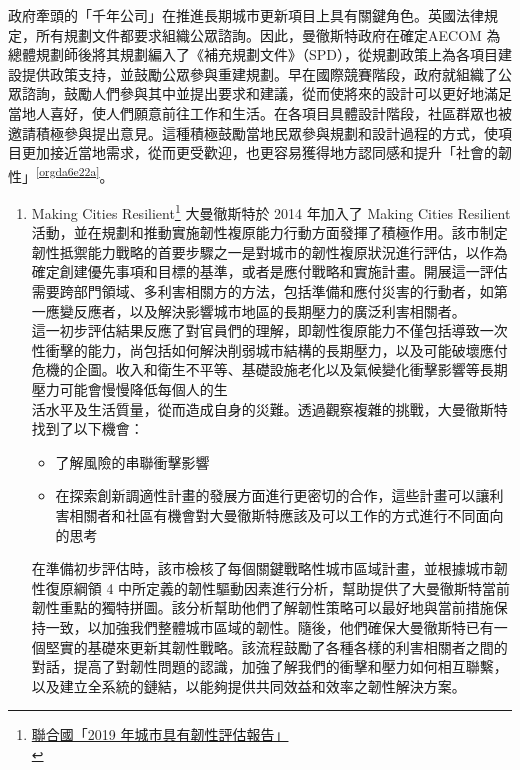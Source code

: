 \documentclass[a4paper,12pt]{article}
\begin{document}
政府牽頭的「千年公司」在推進長期城市更新項目上具有關鍵角色。英國法律規定，所有規劃文件都要求組織公眾諮詢。因此，曼徹斯特政府在確定AECOM 為總體規劃師後將其規劃編入了《補充規劃文件》（SPD），從規劃政策上為各項目建設提供政策支持，並鼓勵公眾參與重建規劃。早在國際競賽階段，政府就組織了公眾諮詢，鼓勵人們參與其中並提出要求和建議，從而使將來的設計可以更好地滿足當地人喜好，使人們願意前往工作和生活。在各項目具體設計階段，社區群眾也被邀請積極參與提出意見。這種積極鼓勵當地民眾參與規劃和設計過程的方式，使項目更加接近當地需求，從而更受歡迎，也更容易獲得地方認同感和提升「社會的韌性」\textsuperscript{\ref{orgda6e22a}}。\\

\begin{enumerate}
\item Making Cities Resilient\footnote{\href{https://www.google.com/url?sa=t\&rct=j\&q=\&esrc=s\&source=web\&cd=\&ved=2ahUKEwjpocmgoNDvAhWNy4sBHX\_TBvkQFjAAegQIBhAD\&url=https\%3A\%2F\%2Fwww.ncdr.nat.gov.tw\%2FFiles\%2FNewsLetter\%2FNew\%2F20191121142348.pdf\&usg=AOvVaw1B2PsXb7vRou7lQ5Cnd11R}{聯合國「2019 年城市具有韌性評估報告」}\\\label{org256b146}}
\label{sec:orga87abb2}
大曼徹斯特於 2014 年加入了 Making Cities Resilient 活動，並在規劃和推動實施韌性複原能力行動方面發揮了積極作用。該市制定韌性抵禦能力戰略的首要步驟之一是對城市的韌性複原狀況進行評估，以作為確定創建優先事項和目標的基準，或者是應付戰略和實施計畫。開展這一評估需要跨部門領域、多利害相關方的方法，包括準備和應付災害的行動者，如第一應變反應者，以及解決影響城市地區的長期壓力的廣泛利害相關者。\\

這一初步評估結果反應了對官員們的理解，即韌性復原能力不僅包括導致一次性衝擊的能力，尚包括如何解決削弱城市結構的長期壓力，以及可能破壞應付危機的企圖。收入和衛生不平等、基礎設施老化以及氣候變化衝擊影響等長期壓力可能會慢慢降低每個人的生\\
活水平及生活質量，從而造成自身的災難。透過觀察複雜的挑戰，大曼徹斯特找到了以下機會：\\
\begin{itemize}
\item 了解風險的串聯衝擊影響\\
\item 在探索創新調適性計畫的發展方面進行更密切的合作，這些計畫可以讓利害相關者和社區有機會對大曼徹斯特應該及可以工作的方式進行不同面向的思考\\
\end{itemize}

在準備初步評估時，該市檢核了每個關鍵戰略性城市區域計畫，並根據城市韌性復原綱領 4 中所定義的韌性驅動因素進行分析，幫助提供了大曼徹斯特當前韌性重點的獨特拼圖。該分析幫助他們了解韌性策略可以最好地與當前措施保持一致，以加強我們整體城市區域的韌性。隨後，他們確保大曼徹斯特已有一個堅實的基礎來更新其韌性戰略。該流程鼓勵了各種各樣的利害相關者之間的對話，提高了對韌性問題的認識，加強了解我們的衝擊和壓力如何相互聯繫，以及建立全系統的鏈結，以能夠提供共同效益和效率之韌性解決方案。\\
\end{enumerate}
\end{document}
